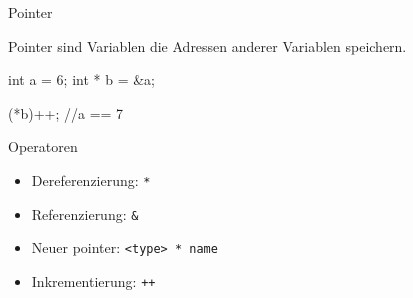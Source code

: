 \ifnum\conditionmacro=1 \documentclass[handout,usenames,dvipsnames]{beamer}\fi
\begin{document}
\begin{frame}[fragile]{Pointer}

Pointer sind Variablen die Adressen anderer Variablen speichern.

\begin{TPCpp}
int a = 6;
int * b = &a;

(*b)++; //a == 7
\end{TPCpp}

\begin{block}{Operatoren}
\begin{itemize}
\item Dereferenzierung: \verb+*+
\item Referenzierung: \verb+&+
\item Neuer pointer: \verb+<type> * name+
\item Inkrementierung: \verb.++.
\end{itemize}
\end{block}
\end{frame}

\end{document}
